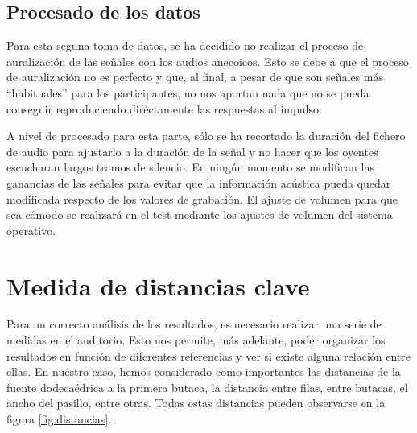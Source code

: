 \documentclass[11pt,a4paper,twoside]{book}
\begin{document}
        \subsection{Procesado de los datos}
            Para esta seguna toma de datos, se ha decidido no realizar el proceso de auralización de las señales con los audios anecoicos. Esto se debe a que el proceso de auralización no es perfecto y que, al final, a pesar de que son señales más ``habituales'' para los participantes, no nos aportan nada que no se pueda conseguir reproduciendo diréctamente las respuestas al impulso.
            
            A nivel de procesado para esta parte, sólo se ha recortado la duración del fichero de audio para ajustarlo a la duración de la señal y no hacer que los oyentes escucharan largos tramos de silencio. En ningún momento se modifican las ganancias de las señales para evitar que la información acústica pueda quedar modificada respecto de los valores de grabación. El ajuste de volumen para que sea cómodo se realizará en el test mediante los ajustes de volumen del sistema operativo.
            
    \section{Medida de distancias clave}
        Para un correcto análisis de los resultados, es necesario realizar una serie de medidas en el auditorio. Esto nos permite, más adelante, poder organizar los resultados en función de diferentes referencias y ver si existe alguna relación entre ellas. En nuestro caso, hemos considerado como importantes las distancias de la fuente dodecaédrica a la primera butaca, la distancia entre filas, entre butacas, el ancho del pasillo, entre otras. Todas estas distancias pueden observarse en la figura \ref{fig:distancias}.
        
\end{document}
